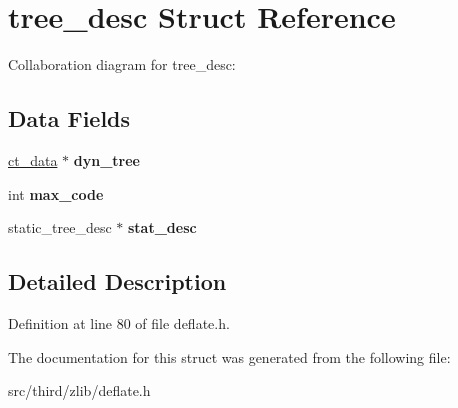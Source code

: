 \hypertarget{structtree__desc}{\section{tree\-\_\-desc Struct Reference}
\label{d9/d5b/structtree__desc}
}


Collaboration diagram for tree\-\_\-desc\-:
\subsection*{Data Fields}
\begin{DoxyCompactItemize}
\item 
\hypertarget{structtree__desc_a532b4371e8e2da219cb85edc1e894643}{\hyperlink{structct__data}{ct\-\_\-data} $\ast$ {\bfseries dyn\-\_\-tree}}\label{d9/d5b/structtree__desc_a532b4371e8e2da219cb85edc1e894643}

\item 
\hypertarget{structtree__desc_a9c10b516bcc560f02ecba4e23e97df07}{int {\bfseries max\-\_\-code}}\label{d9/d5b/structtree__desc_a9c10b516bcc560f02ecba4e23e97df07}

\item 
\hypertarget{structtree__desc_a7840fbd671777fa440712559a98be81d}{static\-\_\-tree\-\_\-desc $\ast$ {\bfseries stat\-\_\-desc}}\label{d9/d5b/structtree__desc_a7840fbd671777fa440712559a98be81d}

\end{DoxyCompactItemize}


\subsection{Detailed Description}


Definition at line 80 of file deflate.\-h.



The documentation for this struct was generated from the following file\-:\begin{DoxyCompactItemize}
\item 
src/third/zlib/deflate.\-h\end{DoxyCompactItemize}
